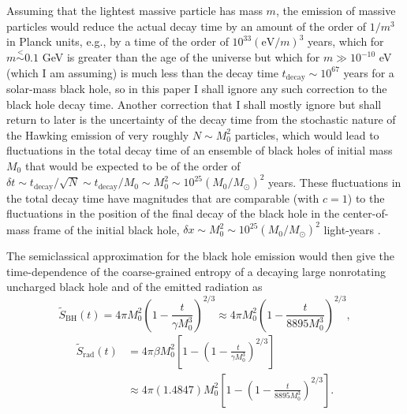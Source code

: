 \documentclass[12pt]{article}
\begin{document}
Assuming that the lightest massive particle has mass $m$, the emission of massive particles would reduce the actual decay time by an amount of the order of $1/m^3$ in Planck units, e.g., by a time of the order of $10^{33}(\mathrm{eV}/m)^3$ years, which for $m \stackrel{<}{\sim} 0.1$ GeV is greater than the age of the universe but which for $m \gg 10^{-10}$ eV (which I am assuming) is much less than the decay time $t_\mathrm{decay} \sim 10^{67}$ years for a solar-mass black hole, so in this paper I shall ignore any such correction to the black hole decay time.  Another correction that I shall mostly ignore but shall return to later is the uncertainty of the decay time from the stochastic nature of the Hawking emission of very roughly $N \sim M_0^2$ particles, which would lead to fluctuations in the total decay time of an ensemble of black holes of initial mass $M_0$ that would be expected to be of the order of $\delta t \sim t_\mathrm{decay}/\sqrt{N} \sim t_\mathrm{decay}/M_0 \sim M_0^2 \sim 10^{25} (M_0/M_\odot)^2$ years.  These fluctuations in the total decay time have magnitudes that are comparable (with $c=1$) to the fluctuations in the position of the final decay of the black hole in the center-of-mass frame of the initial black hole, $\delta x \sim M_0^2 \sim 10^{25} (M_0/M_\odot)^2$ light-years \cite{Page:1979tc,Nomura:2012cx,Nomura:2012ex}.

The semiclassical approximation for the black hole emission \cite{Hawking:1974rv,Hawking:1974sw,Hawking:1976ra} would then give the time-dependence of the coarse-grained entropy of a decaying large nonrotating uncharged black hole and of the emitted radiation as
\begin{equation}
\tilde{S}_\mathrm{BH}(t) 
= 4\pi M_0^2\left(1-\frac{t}{\gamma M_0^3}\right)^{2/3}
\approx 4\pi M_0^2\left(1-\frac{t}{8895 M_0^3}\right)^{2/3},
\label{bh-macro-entropy-evolution}
\end{equation}
\begin{equation}
\begin{split}
\tilde{S}_\mathrm{rad}(t) 
&= 4\pi\beta M_0^2\left[1-\left(1-\frac{t}{\gamma M_0^3}\right)^{2/3}\right]
\\
&\approx 4\pi(1.4847) M_0^2\left[1-\left(1-\frac{t}{8895 M_0^3}\right)^{2/3} \right].
\label{rad-macro-entropy-evolution}
\end{split}
\end{equation}
\end{document}
